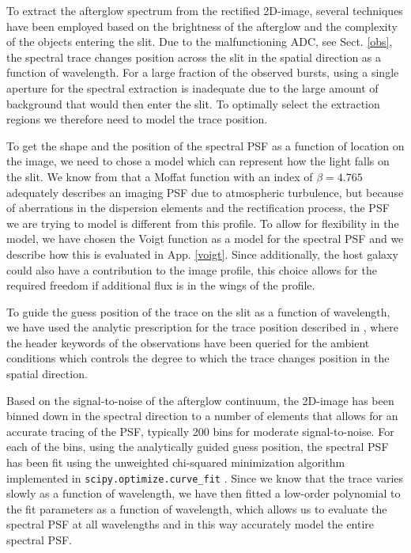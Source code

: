 \documentclass{aa}    %
\begin{document}
To extract the afterglow spectrum from the rectified 2D-image, several
techniques have been employed based on the brightness of the afterglow and the
complexity of the objects entering the slit. Due to the malfunctioning ADC, see
Sect. \ref{obs}, the spectral trace changes position across the slit in the
spatial direction as a function of wavelength. For a large fraction of the
observed bursts, using a single aperture for the spectral extraction is
inadequate due to the large amount of background that would then enter the slit.
To optimally select the extraction regions we therefore need to model the trace
position.

To get the shape and the position of the spectral PSF as a function of location
on the image, we need to chose a model which can represent how the light falls
on the slit. We know from \citet{Trujillo2001} that a Moffat function
\citep{Moffat1969} with an index of $\beta = 4.765$ adequately describes an
imaging PSF due to atmospheric turbulence, but because of aberrations in the
dispersion elements and the rectification process, the PSF we are trying to
model is different from this profile. To allow for flexibility in the model, we
have chosen the Voigt function as a model for the spectral PSF and we describe
how this is evaluated in App. \ref{voigt}. Since additionally, the host galaxy
could also have a contribution to the image profile, this choice allows for the
required freedom if additional flux is in the wings of the profile.

To guide the guess position of the trace on the slit as a function of
wavelength, we have used the analytic prescription for the trace position
described in \citet{Filippenko1982}, where the header keywords of the
observations have been queried for the ambient conditions which controls the
degree to which the trace changes position in the spatial direction.

Based on the signal-to-noise of the afterglow continuum, the 2D-image has been
binned down in the spectral direction to a number of elements that allows for an
accurate tracing of the PSF, typically 200 bins for moderate signal-to-noise.
For each of the bins, using the analytically guided guess position, the spectral
PSF has been fit using the unweighted chi-squared minimization algorithm
implemented in \texttt{scipy.optimize.curve\_fit} \citep{scipy}. Since we know
that the trace varies slowly as a function of wavelength, we have then fitted a
low-order polynomial to the fit parameters as a function of wavelength, which
allows us to evaluate the spectral PSF at all wavelengths and in this way
accurately model the entire spectral PSF.
\end{document}
